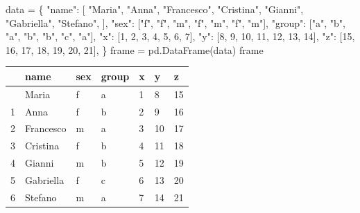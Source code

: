 \documentclass[
  letterpaper,
  krantz2]{{[}./krantz{]}}
\newenvironment{Shaded}{\begin{snugshade}}{\end{snugshade}}
\newcommand{\DecValTok}[1]{\textcolor[rgb]{0.68,0.00,0.00}{#1}}
\newcommand{\NormalTok}[1]{\textcolor[rgb]{0.00,0.23,0.31}{#1}}
\newcommand{\OperatorTok}[1]{\textcolor[rgb]{0.37,0.37,0.37}{#1}}
\newcommand{\StringTok}[1]{\textcolor[rgb]{0.13,0.47,0.30}{#1}}
\begin{document}
\begin{Shaded}
\begin{Highlighting}[]
\NormalTok{data }\OperatorTok{=}\NormalTok{ \{}
    \StringTok{"name"}\NormalTok{: [}
        \StringTok{"Maria"}\NormalTok{,}
        \StringTok{"Anna"}\NormalTok{,}
        \StringTok{"Francesco"}\NormalTok{,}
        \StringTok{"Cristina"}\NormalTok{,}
        \StringTok{"Gianni"}\NormalTok{,}
        \StringTok{"Gabriella"}\NormalTok{,}
        \StringTok{"Stefano"}\NormalTok{,}
\NormalTok{    ],}
    \StringTok{"sex"}\NormalTok{: [}\StringTok{"f"}\NormalTok{, }\StringTok{"f"}\NormalTok{, }\StringTok{"m"}\NormalTok{, }\StringTok{"f"}\NormalTok{, }\StringTok{"m"}\NormalTok{, }\StringTok{"f"}\NormalTok{, }\StringTok{"m"}\NormalTok{],}
    \StringTok{"group"}\NormalTok{: [}\StringTok{"a"}\NormalTok{, }\StringTok{"b"}\NormalTok{, }\StringTok{"a"}\NormalTok{, }\StringTok{"b"}\NormalTok{, }\StringTok{"b"}\NormalTok{, }\StringTok{"c"}\NormalTok{, }\StringTok{"a"}\NormalTok{],}
    \StringTok{"x"}\NormalTok{: [}\DecValTok{1}\NormalTok{, }\DecValTok{2}\NormalTok{, }\DecValTok{3}\NormalTok{, }\DecValTok{4}\NormalTok{, }\DecValTok{5}\NormalTok{, }\DecValTok{6}\NormalTok{, }\DecValTok{7}\NormalTok{],}
    \StringTok{"y"}\NormalTok{: [}\DecValTok{8}\NormalTok{, }\DecValTok{9}\NormalTok{, }\DecValTok{10}\NormalTok{, }\DecValTok{11}\NormalTok{, }\DecValTok{12}\NormalTok{, }\DecValTok{13}\NormalTok{, }\DecValTok{14}\NormalTok{],}
    \StringTok{"z"}\NormalTok{: [}\DecValTok{15}\NormalTok{, }\DecValTok{16}\NormalTok{, }\DecValTok{17}\NormalTok{, }\DecValTok{18}\NormalTok{, }\DecValTok{19}\NormalTok{, }\DecValTok{20}\NormalTok{, }\DecValTok{21}\NormalTok{],}
\NormalTok{\}}
\NormalTok{frame }\OperatorTok{=}\NormalTok{ pd.DataFrame(data)}
\NormalTok{frame}
\end{Highlighting}
\end{Shaded}

\begin{longtable}[]{@{}lllllll@{}}
\toprule\noalign{}
& name & sex & group & x & y & z \\
\midrule\noalign{}
\endhead
\bottomrule\noalign{}
\endlastfoot
0 & Maria & f & a & 1 & 8 & 15 \\
1 & Anna & f & b & 2 & 9 & 16 \\
2 & Francesco & m & a & 3 & 10 & 17 \\
3 & Cristina & f & b & 4 & 11 & 18 \\
4 & Gianni & m & b & 5 & 12 & 19 \\
5 & Gabriella & f & c & 6 & 13 & 20 \\
6 & Stefano & m & a & 7 & 14 & 21 \\
\end{longtable}
\end{document}
